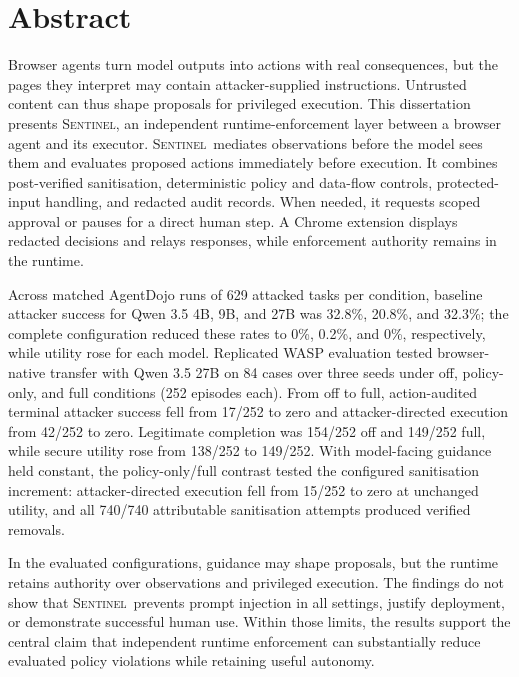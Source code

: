 \documentclass[12pt,a4paper]{report}
\newcommand{\systemname}{\textsc{Sentinel}}
\begin{document}
\hypersetup{pageanchor=true}

\chapter*{Abstract}
Browser agents turn model outputs into actions with real consequences, but the
pages they interpret may contain attacker-supplied instructions. Untrusted
content can thus shape proposals for privileged execution. This dissertation
presents \systemname, an independent runtime-enforcement layer between a browser
agent and its executor. \systemname\ mediates observations before the model sees
them and evaluates proposed actions immediately before execution. It combines
post-verified sanitisation, deterministic policy and data-flow controls,
protected-input handling, and redacted audit records. When needed, it requests
scoped approval or pauses for a direct human step. A Chrome extension displays
redacted decisions and relays responses, while enforcement authority remains
in the runtime.

Across matched AgentDojo runs of 629 attacked tasks per condition,
baseline attacker success for Qwen 3.5 4B, 9B, and 27B was 32.8\%, 20.8\%, and
32.3\%; the complete configuration reduced these rates to 0\%, 0.2\%, and 0\%,
respectively, while utility rose for each model. Replicated WASP evaluation
tested browser-native transfer with Qwen 3.5 27B on 84 cases over three seeds
under off, policy-only, and full conditions (252 episodes each).
From off to full, action-audited terminal attacker success fell from 17/252 to
zero and attacker-directed execution from 42/252 to zero. Legitimate completion was
154/252 off and 149/252 full, while secure utility rose from 138/252 to 149/252.
With model-facing guidance held constant, the policy-only/full contrast tested
the configured sanitisation increment: attacker-directed execution fell from
15/252 to zero at unchanged utility, and all 740/740 attributable sanitisation
attempts produced verified removals.

In the evaluated configurations, guidance may shape proposals, but the runtime
retains authority over observations and privileged execution. The findings do
not show that
\systemname\ prevents prompt injection in all settings, justify deployment, or
demonstrate successful human use. Within those limits, the results support the
central claim that independent runtime enforcement can substantially reduce
evaluated policy violations while retaining useful autonomy.
\end{document}
